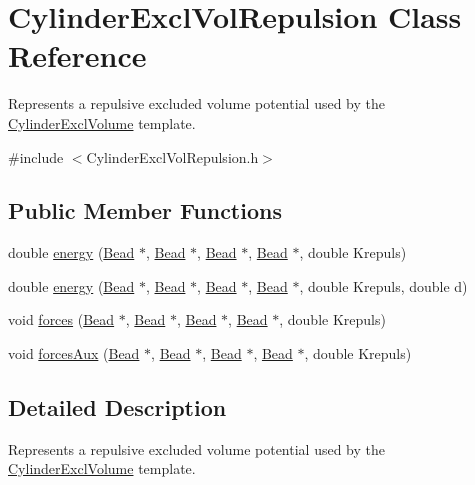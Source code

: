 \hypertarget{classCylinderExclVolRepulsion}{\section{Cylinder\+Excl\+Vol\+Repulsion Class Reference}
\label{classCylinderExclVolRepulsion}
}


Represents a repulsive excluded volume potential used by the \hyperlink{classCylinderExclVolume}{Cylinder\+Excl\+Volume} template.  




{\ttfamily \#include $<$Cylinder\+Excl\+Vol\+Repulsion.\+h$>$}

\subsection*{Public Member Functions}
\begin{DoxyCompactItemize}
\item 
double \hyperlink{classCylinderExclVolRepulsion_a68530aa2a28a75b0dc78eee760f60349}{energy} (\hyperlink{classBead}{Bead} $\ast$, \hyperlink{classBead}{Bead} $\ast$, \hyperlink{classBead}{Bead} $\ast$, \hyperlink{classBead}{Bead} $\ast$, double Krepuls)
\item 
double \hyperlink{classCylinderExclVolRepulsion_a42198905698d6e7a8c942e13797024f8}{energy} (\hyperlink{classBead}{Bead} $\ast$, \hyperlink{classBead}{Bead} $\ast$, \hyperlink{classBead}{Bead} $\ast$, \hyperlink{classBead}{Bead} $\ast$, double Krepuls, double d)
\item 
void \hyperlink{classCylinderExclVolRepulsion_a1b2462b37ffa24668b56198f9e966363}{forces} (\hyperlink{classBead}{Bead} $\ast$, \hyperlink{classBead}{Bead} $\ast$, \hyperlink{classBead}{Bead} $\ast$, \hyperlink{classBead}{Bead} $\ast$, double Krepuls)
\item 
void \hyperlink{classCylinderExclVolRepulsion_aed55ba4665827447777e57fe6acfbee6}{forces\+Aux} (\hyperlink{classBead}{Bead} $\ast$, \hyperlink{classBead}{Bead} $\ast$, \hyperlink{classBead}{Bead} $\ast$, \hyperlink{classBead}{Bead} $\ast$, double Krepuls)
\end{DoxyCompactItemize}


\subsection{Detailed Description}
Represents a repulsive excluded volume potential used by the \hyperlink{classCylinderExclVolume}{Cylinder\+Excl\+Volume} template. 

